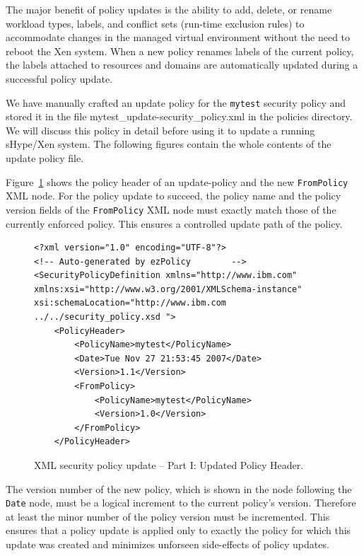 \documentclass[11pt,twoside,final,openright]{report}
\begin{document}
The major benefit of policy updates is the ability to add, delete,
or rename workload types, labels, and conflict sets (run-time
exclusion rules) to accommodate changes in the managed virtual
environment without the need to reboot the Xen system. When a
new policy renames labels of the current policy, the labels
attached to resources and domains are automatically updated
during a successful policy update.

We have manually crafted an update policy for the \verb|mytest|
security policy and stored it in the file mytest\_update-security\_policy.xml
in the policies directory. We will discuss this policy in detail before
using it to update a running sHype/Xen system. The following figures contain
the whole contents of the update policy file.

Figure~\ref{fig:acmupdateheader} shows the policy
header of an update-policy and the new \verb|FromPolicy| XML
node. For the policy update to succeed, the policy name and the
policy version fields of the \verb|FromPolicy| XML node must
exactly match those of the currently enforced policy. This
ensures a controlled update path of the policy.

\begin{figure}[htb]
\begin{scriptsize}
\begin{verbatim}
<?xml version="1.0" encoding="UTF-8"?>
<!-- Auto-generated by ezPolicy        -->
<SecurityPolicyDefinition xmlns="http://www.ibm.com"
xmlns:xsi="http://www.w3.org/2001/XMLSchema-instance"
xsi:schemaLocation="http://www.ibm.com ../../security_policy.xsd ">
    <PolicyHeader>
        <PolicyName>mytest</PolicyName>
        <Date>Tue Nov 27 21:53:45 2007</Date>
        <Version>1.1</Version>
        <FromPolicy>
            <PolicyName>mytest</PolicyName>
            <Version>1.0</Version>
        </FromPolicy>
    </PolicyHeader>
\end{verbatim}
\end{scriptsize}
\caption{XML security policy update -- Part I: Updated Policy Header.}
\label{fig:acmupdateheader}
\end{figure}

The version number of the new policy, which is shown in the
node following the \verb|Date| node, must be a logical increment
to the current policy's version. Therefore at least the minor
number of the policy version must be incremented. This ensures
that a policy update is applied only to exactly the policy for
which this update was created and minimizes unforseen side-effects
 of policy updates.
\end{document}
